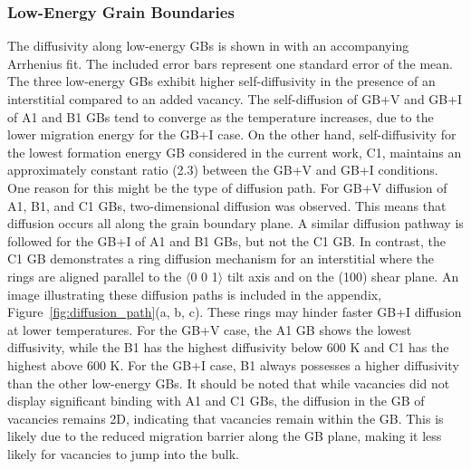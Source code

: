 \documentclass[review]{elsarticle}
\begin{document}
\subsubsection{Low-Energy Grain Boundaries}

\par The diffusivity along low-energy GBs is shown in  with an accompanying Arrhenius fit. The included error bars represent one standard error of the mean. The three low-energy GBs exhibit higher self-diffusivity in the presence of an interstitial compared to an added vacancy. The self-diffusion of GB+V and GB+I of A1 and B1 GBs tend to converge as the temperature increases, due to the lower migration energy for the GB+I case. On the other hand, self-diffusivity for the lowest formation energy GB considered in the current work, C1, maintains an approximately constant ratio (2.3) between the GB+V and GB+I conditions. One reason for this might be the type of diffusion path. For GB+V diffusion of A1, B1, and C1 GBs, two-dimensional diffusion was observed. This means that diffusion occurs all along the grain boundary plane. A similar diffusion pathway is followed for the GB+I of A1 and B1 GBs, but not the C1 GB. In contrast, the C1 GB demonstrates a ring diffusion mechanism for an interstitial where the rings are aligned parallel to the $\langle$0 0 1$\rangle$ tilt axis and on the (100) shear plane. An image illustrating these diffusion paths is included in the appendix, Figure~\ref{fig:diffusion_path}(a, b, c). These rings may hinder faster GB+I diffusion at lower temperatures. For the GB+V case, the A1 GB shows the lowest diffusivity, while the B1 has the highest diffusivity below 600 K and C1 has the highest above 600 K. For the GB+I case, B1 always possesses a higher diffusivity than the other low-energy GBs. It should be noted that while vacancies did not display significant binding with A1 and C1 GBs, the diffusion in the GB of vacancies remains 2D, indicating that vacancies remain within the GB. This is likely due to the reduced migration barrier along the GB plane, making it less likely for vacancies to jump into the bulk.
\end{document}
